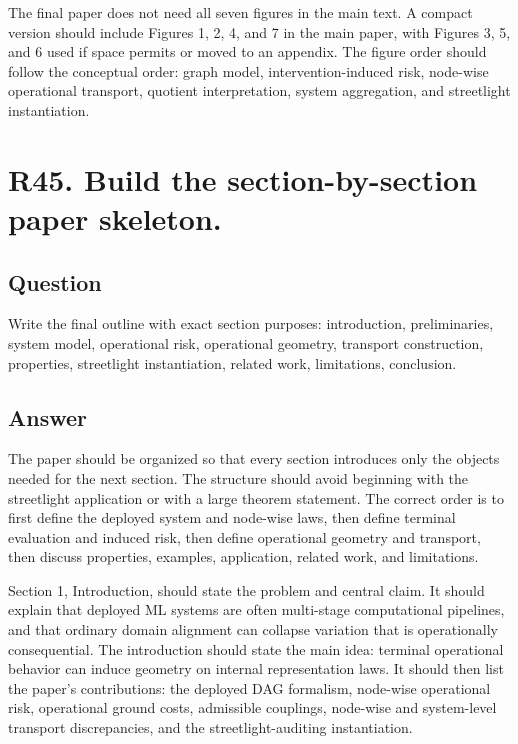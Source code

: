 \documentclass[11pt,a4paper]{article}
\begin{document}
The final paper does not need all seven figures in the main text. A compact version should include Figures 1, 2, 4, and 7 in the main paper, with Figures 3, 5, and 6 used if space permits or moved to an appendix. The figure order should follow the conceptual order: graph model, intervention-induced risk, node-wise operational transport, quotient interpretation, system aggregation, and streetlight instantiation.

\section*{R45. Build the section-by-section paper skeleton.}

\subsection*{Question}

Write the final outline with exact section purposes: introduction, preliminaries, system model, operational risk, operational geometry, transport construction, properties, streetlight instantiation, related work, limitations, conclusion.

\subsection*{Answer}

The paper should be organized so that every section introduces only the objects needed for the next section. The structure should avoid beginning with the streetlight application or with a large theorem statement. The correct order is to first define the deployed system and node-wise laws, then define terminal evaluation and induced risk, then define operational geometry and transport, then discuss properties, examples, application, related work, and limitations.

Section 1, Introduction, should state the problem and central claim. It should explain that deployed ML systems are often multi-stage computational pipelines, and that ordinary domain alignment can collapse variation that is operationally consequential. The introduction should state the main idea: terminal operational behavior can induce geometry on internal representation laws. It should then list the paper's contributions: the deployed DAG formalism, node-wise operational risk, operational ground costs, admissible couplings, node-wise and system-level transport discrepancies, and the streetlight-auditing instantiation.
\end{document}
